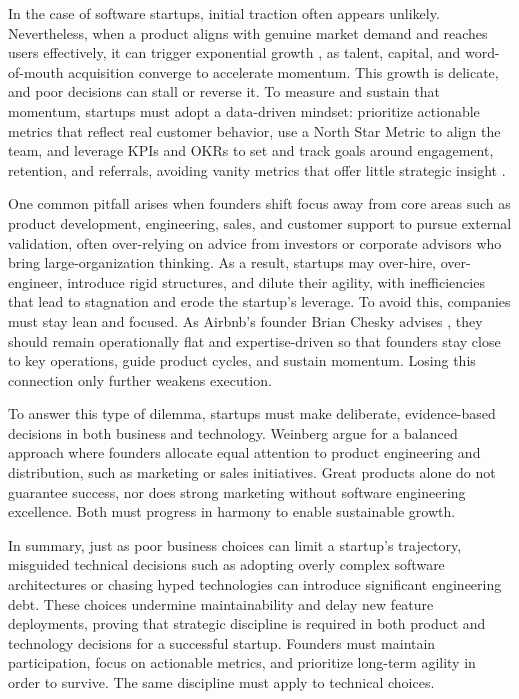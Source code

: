In the case of software startups, initial traction often appears unlikely. Nevertheless, when a product aligns with genuine market demand and reaches users effectively, it can trigger exponential growth \cite{graham2012}, as talent, capital, and word-of-mouth acquisition converge to accelerate momentum. This growth is delicate, and poor decisions can stall or reverse it. To measure and sustain that momentum, startups must adopt a data-driven mindset: prioritize actionable metrics that reflect real customer behavior, use a North Star Metric to align the team, and leverage KPIs and OKRs to set and track goals around engagement, retention, and referrals, avoiding vanity metrics that offer little strategic insight \cite{blank2012, doerr2018measure, bernstein2020kpi}.

One common pitfall arises when founders shift focus away from core areas such as product development, engineering, sales, and customer support to pursue external validation, often over-relying on advice from investors or corporate advisors who bring large-organization thinking. As a result, startups may over-hire, over-engineer, introduce rigid structures, and dilute their agility, with inefficiencies that lead to stagnation and erode the startup’s leverage. To avoid this, companies must stay lean and focused. As Airbnb’s founder Brian Chesky advises \cite{chesky2024}, they should remain operationally flat and expertise-driven so that founders stay close to key operations, guide product cycles, and sustain momentum. Losing this connection only further weakens execution.

To answer this type of dilemma, startups must make deliberate, evidence-based decisions in both business and technology. Weinberg \cite{weinberg2015} argue for a balanced approach where founders allocate equal attention to product engineering and distribution, such as marketing or sales initiatives. Great products alone do not guarantee success, nor does strong marketing without software engineering excellence. Both must progress in harmony to enable sustainable growth.

In summary, just as poor business choices can limit a startup's trajectory, misguided technical decisions such as adopting overly complex software architectures or chasing hyped technologies can introduce significant engineering debt. These choices undermine maintainability and delay new feature deployments, proving that strategic discipline is required in both product and technology decisions for a successful startup. Founders must maintain participation, focus on actionable metrics, and prioritize long-term agility in order to survive. The same discipline must apply to technical choices.


